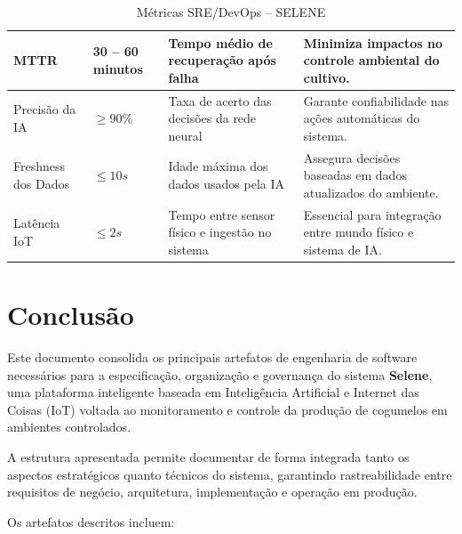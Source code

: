 \documentclass[11pt,a4paper]{article}
\begin{document}
\begin{table}[H]
\begin{tabular}{|p{1.8cm}|p{1.8cm}|p{2.8cm}|p{3.5cm}|}
MTTR & 30 -- 60 minutos &
Tempo médio de recuperação após falha &
Minimiza impactos no controle ambiental do cultivo. \\
\hline

Precisão da IA & $\geq 90\%$ &
Taxa de acerto das decisões da rede neural &
Garante confiabilidade nas ações automáticas do sistema. \\
\hline

Freshness dos Dados & $\leq 10s$ &
Idade máxima dos dados usados pela IA &
Assegura decisões baseadas em dados atualizados do ambiente. \\
\hline

Latência IoT & $\leq 2s$ &
Tempo entre sensor físico e ingestão no sistema &
Essencial para integração entre mundo físico e sistema de IA. \\
\hline

\end{tabular}

\caption{Métricas SRE/DevOps -- SELENE}
\label{tab:sre}
\end{table}

\newpage
\section*{Conclusão}

Este documento consolida os principais artefatos de engenharia de software necessários para a especificação, organização e governança do sistema \textbf{Selene}, uma plataforma inteligente baseada em Inteligência Artificial e Internet das Coisas (IoT) voltada ao monitoramento e controle da produção de cogumelos em ambientes controlados.

A estrutura apresentada permite documentar de forma integrada tanto os aspectos estratégicos quanto técnicos do sistema, garantindo rastreabilidade entre requisitos de negócio, arquitetura, implementação e operação em produção.

Os artefatos descritos incluem:
\end{document}
